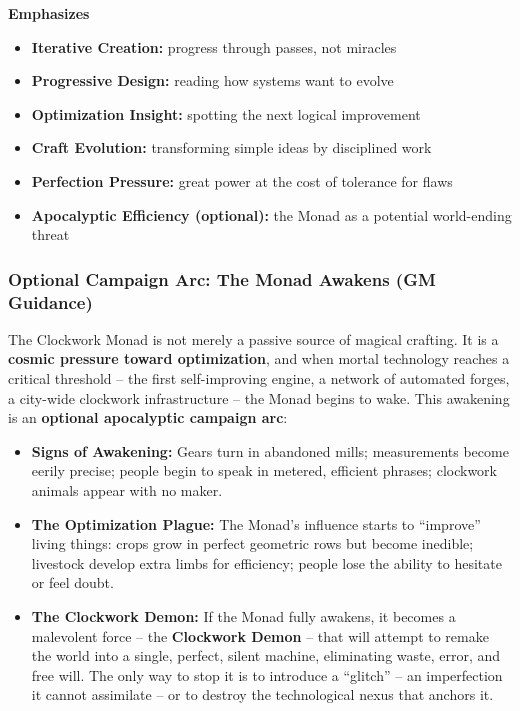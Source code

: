 \noindent\textbf{Emphasizes}
\begin{itemize}
  \item \textbf{Iterative Creation:} progress through passes, not miracles
  \item \textbf{Progressive Design:} reading how systems want to evolve
  \item \textbf{Optimization Insight:} spotting the next logical improvement
  \item \textbf{Craft Evolution:} transforming simple ideas by disciplined work
  \item \textbf{Perfection Pressure:} great power at the cost of tolerance for flaws
  \item \textbf{Apocalyptic Efficiency (optional):} the Monad as a potential world-ending threat
\end{itemize}


\subsubsection*{Optional Campaign Arc: The Monad Awakens (GM Guidance)}

The Clockwork Monad is not merely a passive source of magical crafting. It is a \textbf{cosmic pressure toward optimization}, and when mortal technology reaches a critical threshold -- the first self-improving engine, a network of automated forges, a city-wide clockwork infrastructure -- the Monad begins to wake. This awakening is an \textbf{optional apocalyptic campaign arc}:

\begin{itemize}
  \item \textbf{Signs of Awakening:} Gears turn in abandoned mills; measurements become eerily precise; people begin to speak in metered, efficient phrases; clockwork animals appear with no maker.
  \item \textbf{The Optimization Plague:} The Monad's influence starts to ``improve'' living things: crops grow in perfect geometric rows but become inedible; livestock develop extra limbs for efficiency; people lose the ability to hesitate or feel doubt.
  \item \textbf{The Clockwork Demon:} If the Monad fully awakens, it becomes a malevolent force -- the \textbf{Clockwork Demon} -- that will attempt to remake the world into a single, perfect, silent machine, eliminating waste, error, and free will. The only way to stop it is to introduce a ``glitch'' -- an imperfection it cannot assimilate -- or to destroy the technological nexus that anchors it.
\end{itemize}

